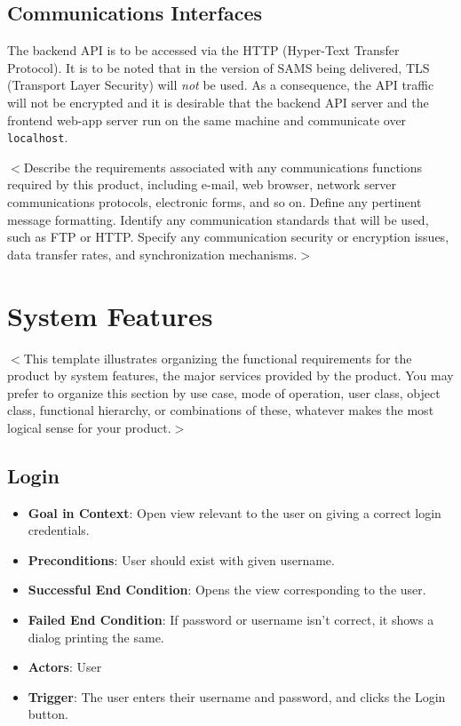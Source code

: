 \documentclass{scrreprt}
\begin{document}
\section{Communications Interfaces}
The backend API is to be accessed via the HTTP (Hyper-Text Transfer Protocol). It is to be noted that in the version of SAMS being delivered, TLS (Transport Layer Security) will \emph{not} be used. As a consequence, the API traffic will not be encrypted and it is desirable that the backend API server and the frontend web-app server run on the same machine and communicate over \texttt{localhost}.

$<$Describe the requirements associated with any communications functions 
required by this product, including e-mail, web browser, network server 
communications protocols, electronic forms, and so on. Define any pertinent 
message formatting. Identify any communication standards that will be used, such 
as FTP or HTTP. Specify any communication security or encryption issues, data 
transfer rates, and synchronization mechanisms.$>$


\chapter{System Features}
$<$This template illustrates organizing the functional requirements for the 
product by system features, the major services provided by the product. You may 
prefer to organize this section by use case, mode of operation, user class, 
object class, functional hierarchy, or combinations of these, whatever makes the 
most logical sense for your product.$>$

\section{Login}
\begin{itemize}
\item \textbf{Goal in Context}: Open view relevant to the user on giving a correct login credentials.
\item \textbf{Preconditions}: User should exist with given username.
\item \textbf{Successful End Condition}: Opens the view corresponding to the user.
\item \textbf{Failed End Condition}: If password or username isn't correct, it shows a dialog printing the same.
\item \textbf{Actors}: User
\item \textbf{Trigger}: The user enters their username and password, and clicks the Login button.
\end{itemize}
\end{document}
